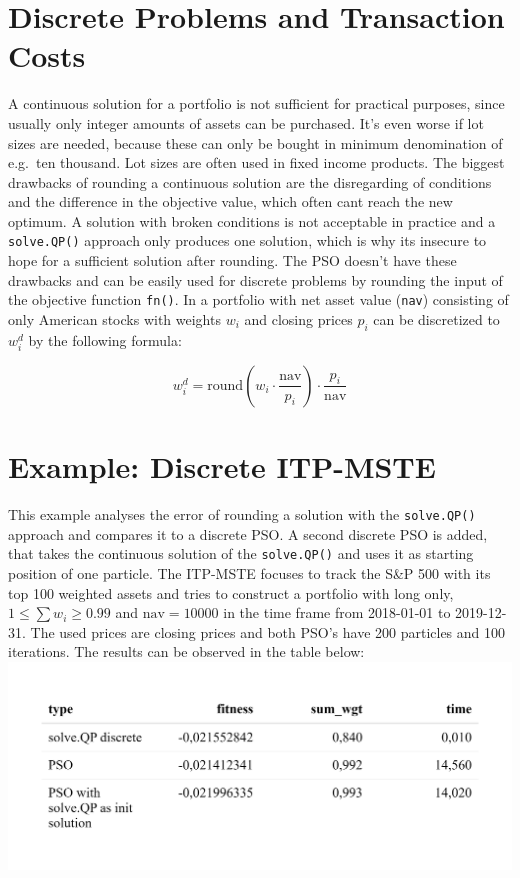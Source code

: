 \documentclass[
  oneside]{book}
\begin{document}
\hypertarget{discrete-problems-and-transaction-costs}{%
\section{Discrete Problems and Transaction Costs}\label{discrete-problems-and-transaction-costs}}

A continuous solution for a portfolio is not sufficient for practical purposes, since usually only integer amounts of assets can be purchased. It's even worse if lot sizes are needed, because these can only be bought in minimum denomination of e.g.~ten thousand. Lot sizes are often used in fixed income products. The biggest drawbacks of rounding a continuous solution are the disregarding of conditions and the difference in the objective value, which often cant reach the new optimum. A solution with broken conditions is not acceptable in practice and a \texttt{solve.QP()} approach only produces one solution, which is why its insecure to hope for a sufficient solution after rounding. The PSO doesn't have these drawbacks and can be easily used for discrete problems by rounding the input of the objective function \texttt{fn()}. In a portfolio with net asset value (\texttt{nav}) consisting of only American stocks with weights \(w_i\) and closing prices \(p_i\) can be discretized to \(w_i^d\) by the following formula:

\[
  w_i^d =\text{round}(w_i \cdot \frac{\text{nav}}{p_i})\cdot \frac{p_i}{\text{nav}}
\]

\hypertarget{example-discrete-itp-mste}{%
\section{Example: Discrete ITP-MSTE}\label{example-discrete-itp-mste}}

This example analyses the error of rounding a solution with the \texttt{solve.QP()} approach and compares it to a discrete PSO. A second discrete PSO is added, that takes the continuous solution of the \texttt{solve.QP()} and uses it as starting position of one particle. The ITP-MSTE focuses to track the S\&P 500 with its top 100 weighted assets and tries to construct a portfolio with long only, \(1 \leq \textstyle\sum w_i \geq 0.99\) and \(\text{nav} = 10000\) in the time frame from 2018-01-01 to 2019-12-31. The used prices are closing prices and both PSO's have 200 particles and 100 iterations. The results can be observed in the table below:
\includegraphics{Master_Thesis_files/figure-latex/pso9-1.png}
\end{document}
